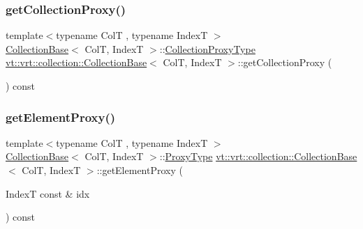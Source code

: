 \subsubsection{\texorpdfstring{get\+Collection\+Proxy()}{getCollectionProxy()}}
{\footnotesize\ttfamily template$<$typename ColT , typename IndexT $>$ \\
\hyperlink{structvt_1_1vrt_1_1collection_1_1_collection_base}{Collection\+Base}$<$ ColT, IndexT $>$\+::\hyperlink{structvt_1_1vrt_1_1collection_1_1_collection_base_af40b40a2ee128748bcb917f14a0152b4}{Collection\+Proxy\+Type} \hyperlink{structvt_1_1vrt_1_1collection_1_1_collection_base}{vt\+::vrt\+::collection\+::\+Collection\+Base}$<$ ColT, IndexT $>$\+::get\+Collection\+Proxy (\begin{DoxyParamCaption}{ }\end{DoxyParamCaption}) const}

\mbox{\label{structvt_1_1vrt_1_1collection_1_1_collection_base_acf2b3173e77b083920e3d4a06728e4c6}} 
\subsubsection{\texorpdfstring{get\+Element\+Proxy()}{getElementProxy()}}
{\footnotesize\ttfamily template$<$typename ColT , typename IndexT $>$ \\
\hyperlink{structvt_1_1vrt_1_1collection_1_1_collection_base}{Collection\+Base}$<$ ColT, IndexT $>$\+::\hyperlink{structvt_1_1vrt_1_1collection_1_1_collection_base_a0c2fd2443732bebc963f6278b7ba089b}{Proxy\+Type} \hyperlink{structvt_1_1vrt_1_1collection_1_1_collection_base}{vt\+::vrt\+::collection\+::\+Collection\+Base}$<$ ColT, IndexT $>$\+::get\+Element\+Proxy (\begin{DoxyParamCaption}\item[{IndexT const \&}]{idx }\end{DoxyParamCaption}) const}

\mbox{\label{structvt_1_1vrt_1_1collection_1_1_collection_base_a34f089d6f08e84b1745a265ad865807a}} 
